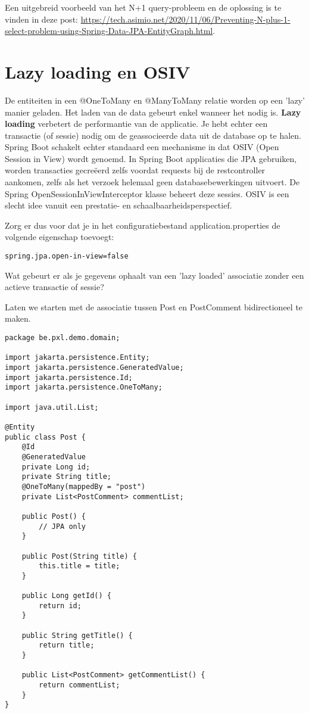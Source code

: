 Een uitgebreid voorbeeld van het N+1 query-probleem en de oplossing is te vinden in deze post: \url{https://tech.asimio.net/2020/11/06/Preventing-N-plus-1-select-problem-using-Spring-Data-JPA-EntityGraph.html}.

\section{Lazy loading en OSIV}

De entiteiten in een @OneToMany en @ManyToMany relatie worden op een 'lazy' manier geladen. Het laden van de data gebeurt enkel wanneer het nodig is.  \textbf{Lazy loading} verbetert de performantie van de applicatie.  Je hebt echter een transactie (of sessie) nodig om de geassocieerde data uit de database op te halen.
Spring Boot schakelt echter standaard een mechanisme in dat OSIV (Open Session in View) wordt genoemd. In Spring Boot applicaties die JPA gebruiken, worden transacties gecreëerd zelfs voordat requests bij de restcontroller aankomen, zelfs als het verzoek helemaal geen databasebewerkingen uitvoert. De Spring OpenSessionInViewInterceptor klasse beheert deze sessies.  OSIV is een slecht idee vanuit een prestatie- en schaalbaarheidsperspectief.

Zorg er dus voor dat je in het configuratiebestand application.properties de volgende eigenschap toevoegt:


\begin{lstlisting}
spring.jpa.open-in-view=false
\end{lstlisting}

Wat gebeurt er als je gegevens ophaalt van een 'lazy loaded' associatie zonder een actieve transactie of sessie?

Laten we starten met de associatie tussen Post en PostComment bidirectioneel te maken.

\begin{lstlisting}
package be.pxl.demo.domain;

import jakarta.persistence.Entity;
import jakarta.persistence.GeneratedValue;
import jakarta.persistence.Id;
import jakarta.persistence.OneToMany;

import java.util.List;

@Entity
public class Post {
	@Id
	@GeneratedValue
	private Long id;
	private String title;
	@OneToMany(mappedBy = "post")
	private List<PostComment> commentList;

	public Post() {
		// JPA only
	}

	public Post(String title) {
		this.title = title;
	}

	public Long getId() {
		return id;
	}

	public String getTitle() {
		return title;
	}

	public List<PostComment> getCommentList() {
		return commentList;
	}
}
\end{lstlisting}

